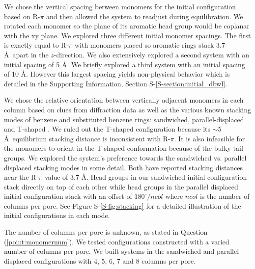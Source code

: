 \documentclass[journal=jpcbfk,manuscript=article]{achemso}
\begin{document}
  We chose the vertical spacing between monomers for the initial configuration based
  on R-$\pi$ and then allowed the system to readjust during equilibration. We rotated 
  each monomer so the plane of its aromatic head group would be coplanar with the xy plane. We
  explored three different initial monomer spacings. The first is exactly
  equal to R-$\pi$ with monomers placed so aromatic rings stack 3.7 \AA~apart in
  the $z$-direction. We also extensively explored a second system with an initial spacing of 5
  \AA. We briefly explored a third system with an initial spacing of 10
  \AA. However this largest spacing yields non-physical behavior which is detailed in the 
  Supporting Information, Section S-\ref{S-section:initial_dbwl}. 


  We chose the relative orientation between vertically adjacent monomers in each column 
  based on clues from diffraction data as well as the various known stacking modes of 
  benzene and substituted benzene rings: sandwiched, parallel-displaced and T-shaped
  \cite{sinnokrot_estimates_2002}. We ruled out the T-shaped configuration
  because its $\sim$5 \AA~equilibrium stacking distance \cite{sinnokrot_estimates_2002}
  is inconsistent with R-$\pi$. It is also infeasible for the monomers to orient in the 
  T-shaped conformation because of the bulky tail groups. We explored the system's 
  preference towards the sandwiched vs. parallel displaced stacking modes in some detail.
  Both have reported stacking distances near the R-$\pi$ value of 3.7 \AA. Head groups in
  our sandwiched initial configuration stack directly on top of each other while
  head groups in the parallel displaced initial configuration stack with an offset
  of $180^\circ/ncol$ where $ncol$ is the number of columns per pore. See Figure 
  S-\ref{S-fig:stacking} for a detailed illustration of the initial configurations in each mode.
  

  The number of columns per pore is unknown, as stated in Question
  (\ref{point:monomernum}). We tested configurations constructed with a varied
  number of columns per pore. We built systems in the sandwiched and parallel
  displaced configurations with 4, 5, 6, 7 and 8 columns per pore.
\end{document}
